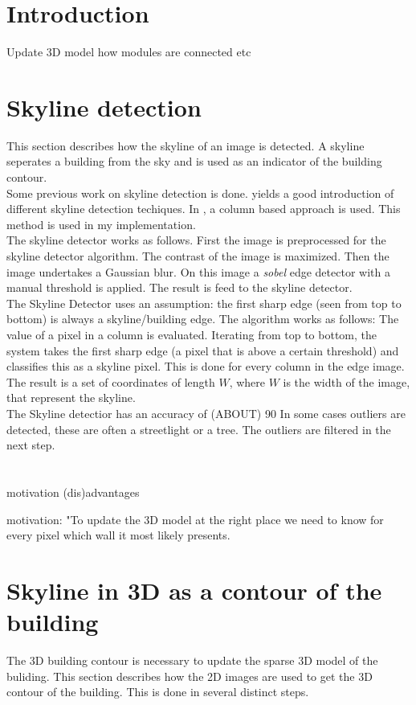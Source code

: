\section{Introduction}
Update 3D model
how modules are connected etc

\section{Skyline detection}
This section describes how the skyline of an image is detected. A skyline
seperates a building from the sky and is used as an indicator of the building contour.
\\
Some previous work on skyline detection is done.
\cite{9} yields a good introduction of different skyline detection techiques.
In \cite{1}, a column based approach is used. This method is used in my implementation.
\\
The skyline detector works as follows.
First the image is preprocessed for the skyline detector algorithm.
The contrast of the image is maximized. Then the image undertakes a Gaussian blur.  On this image a
\textit{sobel} edge detector with a manual threshold is applied.
The result is feed to the skyline detector.
\\
The Skyline Detector uses an assumption: the first sharp edge (seen
from top to bottom) is always a skyline/building edge. The algorithm works as
follows: The value of a pixel in a column is evaluated. Iterating from top to
bottom, the system takes the first sharp edge (a pixel that is above a certain
threshold) and classifies this as a skyline pixel.  This is done for every
column in the edge image. The result is a set of coordinates of length $W$,
where $W$ is the width of the image, that represent the skyline.
\\
The Skyline detectior has an accuracy of (ABOUT) 90%
In some cases outliers are detected, these are often a streetlight or a tree. The outliers are
filtered in the next step.

\section{}
motivation
(dis)advantages

motivation:
"To update the 3D model at the right place we need to know for every pixel 
which wall it most likely presents.  

\section{Skyline in 3D as a contour of the building}
The 3D building contour is necessary to update the sparse 3D model of the buliding.
This section describes how the 2D images are used to get the 3D contour of the
building. This is done in several distinct steps.  


